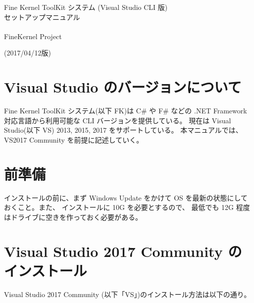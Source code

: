 \documentclass[a4paper]{jsarticle}
\begin{document}
\begin{center}
\begin{Large}
Fine Kernel ToolKit システム (Visual Studio CLI 版) \\
	セットアップマニュアル \\ ~ \\
FineKernel Project \\
\end{Large}
(2017/04/12版)
\end{center}

\section{Visual Studio のバージョンについて}
Fine Kernel ToolKit システム(以下 FK)は 
C\# や F\# などの .NET Framework 対応言語から利用可能な CLI バージョンを提供している。
現在は Visual Studio(以下 VS) 2013, 2015, 2017 をサポートしている。
本マニュアルでは、VS2017 Community を前提に記述していく。

\section{前準備}

インストールの前に、まず Windows Update をかけて
OS を最新の状態にしておくこと。また、
インストールに 10G を必要とするので、
最低でも 12G 程度はドライブに空きを作っておく必要がある。

\section{Visual Studio 2017 Community のインストール}
Visual Studio 2017 Community (以下「VS」)のインストール方法は以下の通り。
\end{document}
